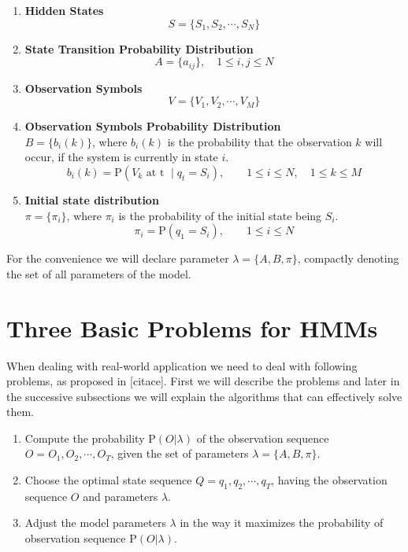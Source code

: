 \documentclass[thesis=M,english]{FITthesis}[2012/10/20]
\begin{document}
\begin{enumerate}[resume]
\item \textbf{Hidden States}
\begin{equation}
S = \{ S_1,S_2, \cdots, S_N \}
\end{equation} 
\item \textbf{State Transition Probability Distribution}
\begin{equation}
A = \{ a_{ij} \}, \quad 1 \leq i,j \leq N
\end{equation} 
\item \textbf{Observation Symbols}
\begin{equation}
V = \{ V_1,V_2, \cdots, V_M \} 
\end{equation}
\item \textbf{Observation Symbols Probability Distribution} \\
$B = \{ b_{i}(k) \}$, where $b_{i}(k)$ is the probability that the observation $k$ will occur, if the system is currently in state $i$. 
\begin{equation}
b_i(k) = \mathrm{P}(V_k \text{ at t } \mid q_t = S_i), \qquad 1 \leq i \leq N, \quad 1 \leq k \leq M
\end{equation}
\item \textbf{Initial state distribution} \\
$\pi = \{ \pi_i \}$, where $\pi_i$ is the probability of the initial state being $S_i$.
\begin{equation}
\pi_{i} = \mathrm{P}(q_1 = S_i), \qquad 1 \leq i \leq N
\end{equation}
\end{enumerate}

For the convenience we will declare parameter $\lambda = \{A,B,\pi\}$, compactly denoting the set of all parameters of the model.   

\section{Three Basic Problems for HMMs}
When dealing with real-world application we need to deal with following problems, as proposed in [citace]. First we will describe the problems and later in the successive subsections we will explain the algorithms that can effectively solve them. 

\begin{enumerate}
\item Compute the probability $ \mathrm{P}(O|\lambda) $ of the observation sequence $O = O_1,O_2,\cdots,O_T$, given the set of parameters $\lambda = \{A,B,\pi\}$. 
\item Choose the optimal state sequence $Q = q_1,q_2,\cdots,q_T$, having the observation sequence $O$ and parameters $\lambda$.
\item Adjust the model parameters $\lambda$ in the way it maximizes the probability of observation sequence $ \mathrm{P}(O|\lambda) $. 
\end{enumerate}
\end{document}
